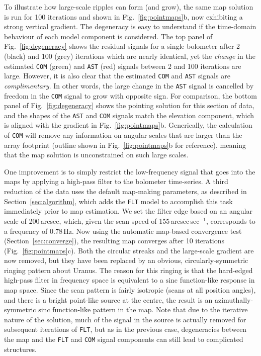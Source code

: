 \documentclass[useAMS,usenatbib,nofootinbib]{mn2e}
\def\sinc{\mathrm{sinc}}
\newcommand{\model}[1]{\texttt{#1}}
\begin{document}
To illustrate how large-scale ripples can form (and grow), the same
map solution is run for 100 iterations and shown in
Fig.~\ref{fig:pointmaps}b, now exhibiting a strong vertical
gradient. The degeneracy is easy to understand if the time-domain
behaviour of each model component is considered. The top panel of
Fig.~\ref{fig:degeneracy} shows the residual signals for a single
bolometer after 2 (black) and 100 (grey) iterations which are nearly
identical, yet the \emph{change} in the estimated \model{COM} (green)
and \model{AST} (red) signals between 2 and 100 iterations are
large. However, it is also clear that the estimated \model{COM} and
\model{AST} signals are \emph{complimentary}. In other words, the
large change in the \model{AST} signal is cancelled by freedom in the
\model{COM} signal to grow with opposite sign. For comparison, the
bottom panel of Fig.~\ref{fig:degeneracy} shows the pointing solution
for this section of data, and the shapes of the \model{AST} and
\model{COM} signals match the elevation component, which is aligned
with the gradient in Fig.~\ref{fig:pointmaps}b. Generically, the
calculation of \model{COM} will remove any information on angular
scales that are larger than the array footprint (outline shown in
Fig.~\ref{fig:pointmaps}b for reference), meaning that the map
solution is unconstrained on such large scales.

One improvement is to simply restrict the low-frequency signal that
goes into the maps by applying a high-pass filter to the bolometer
time-series. A third reduction of the data uses the default map-making
parameters, as described in Section~\ref{sec:algorithm}, which adds
the \model{FLT} model to accomplish this task immediately prior to map
estimation. We set the filter edge based on an angular scale of
200\,arcsec, which, given the scan speed of 155\,arcsec\,sec$^{-1}$,
corresponds to a frequency of 0.78\,Hz. Now using the automatic
map-based convergence test (Section~\ref{sec:converge}), the resulting
map converges after 10 iterations (Fig.~\ref{fig:pointmaps}c). Both
the circular streaks and the large-scale gradient are now removed, but
they have been replaced by an obvious, circularly-symmetric ringing
pattern about Uranus. The reason for this ringing is that the
hard-edged high-pass filter in frequency space is equivalent to a
$\sinc$ function-like response in map space. Since the scan pattern is
fairly isotropic (scans at all position angles), and there is a bright
point-like source at the centre, the result is an
azimuthally-symmetric $\sinc$ function-like pattern in the map. Note
that due to the iterative nature of the solution, much of the signal
in the source is actually removed for subsequent iterations of
\model{FLT}, but as in the previous case, degeneracies between the map
and the \model{FLT} and \model{COM} signal components can still lead
to complicated structures.
\end{document}
